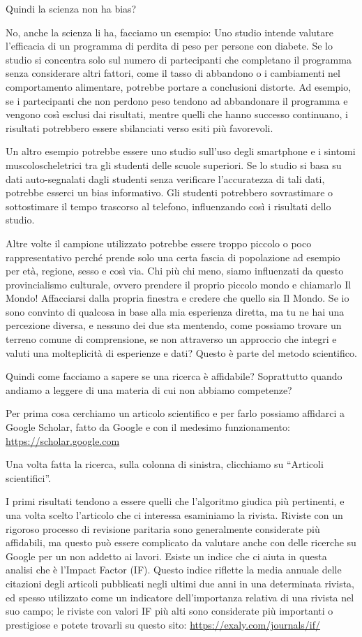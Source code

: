 \documentclass[12pt]{book} %
\begin{document}
Quindi la scienza non ha bias?

No, anche la scienza li ha, facciamo un esempio: Uno studio intende valutare l'efficacia di un
programma di perdita di peso per persone con diabete. Se lo studio si concentra solo sul numero di partecipanti che
completano il programma senza considerare altri fattori, come il tasso di abbandono o i cambiamenti nel comportamento
alimentare, potrebbe portare a conclusioni distorte. Ad esempio, se i partecipanti che non perdono peso tendono ad
abbandonare il programma e vengono così esclusi dai risultati, mentre quelli che hanno successo continuano, i risultati
potrebbero essere sbilanciati verso esiti più favorevoli.

Un altro esempio potrebbe essere uno studio sull'uso degli smartphone e i sintomi
muscoloscheletrici tra gli studenti delle scuole superiori. Se lo studio si basa su dati auto-segnalati dagli studenti
senza verificare l'accuratezza di tali dati, potrebbe esserci un bias informativo. Gli studenti
potrebbero sovrastimare o sottostimare il tempo trascorso al telefono, influenzando così i risultati dello studio.

Altre volte il campione utilizzato potrebbe essere troppo piccolo o poco rappresentativo perché prende solo una certa fascia di popolazione ad esempio per età, regione, sesso e così via. Chi più chi meno, siamo influenzati da questo provincialismo culturale, ovvero prendere il proprio piccolo mondo e chiamarlo Il Mondo! Affacciarsi dalla propria finestra e credere che quello sia Il Mondo. Se io sono convinto di qualcosa in base alla mia esperienza diretta, ma tu ne hai una percezione diversa, e nessuno dei due sta mentendo, come possiamo trovare un terreno comune di comprensione, se non attraverso un approccio che integri e valuti una molteplicità di esperienze e dati? Questo è parte del metodo scientifico.

Quindi come facciamo a sapere se una ricerca è affidabile? Soprattutto quando andiamo a leggere di una materia di cui
non abbiamo competenze?

Per prima cosa cerchiamo un articolo scientifico e per farlo possiamo affidarci a Google Scholar, fatto da Google e con
il medesimo funzionamento: \url{https://scholar.google.com}

Una volta fatta la ricerca, sulla colonna di sinistra, clicchiamo su “Articoli scientifici”.

I primi risultati tendono a essere quelli che l'algoritmo giudica più pertinenti, e una volta scelto l'articolo che ci interessa esaminiamo
la rivista. Riviste con un rigoroso processo di revisione paritaria sono generalmente considerate più affidabili, ma
questo può essere complicato da valutare anche con delle ricerche su Google per un non addetto ai lavori. Esiste un
indice che ci aiuta in questa analisi che è l'Impact Factor (IF). Questo indice riflette la media
annuale delle citazioni degli articoli pubblicati negli ultimi due anni in una determinata rivista, ed spesso
utilizzato come un indicatore dell'importanza relativa di una rivista nel suo campo; le riviste
con valori IF più alti sono considerate più importanti o prestigiose e potete trovarli su questo sito: \url{https://exaly.com/journals/if/}
\end{document}
